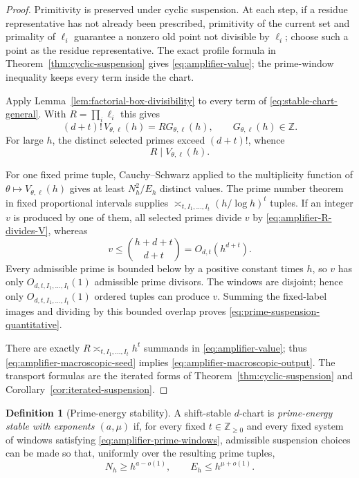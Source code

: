 \documentclass[11pt,reqno]{amsart}
\theoremstyle{definition}
\newtheorem{definition}[theorem]{Definition}
\theoremstyle{remark}
\begin{document}
\begin{proof}
Primitivity is preserved under cyclic suspension.  At each step, if a
residue representative has not already been prescribed, primitivity of the
current set and primality of $\ell_i$ guarantee a nonzero old point not
divisible by $\ell_i$; choose such a point as the residue representative.
The exact profile
formula in Theorem~\ref{thm:cyclic-suspension} gives
\eqref{eq:amplifier-value}; the prime-window inequality keeps every term
inside the chart.

Apply Lemma~\ref{lem:factorial-box-divisibility} to every term of
\eqref{eq:stable-chart-general}.  With $R=\prod_i\ell_i$ this gives
\begin{equation}\label{eq:amplifier-divisor-identity}
 (d+t)!\,V_{\theta,\boldsymbol\ell}(h)
 =R G_{\theta,\boldsymbol\ell}(h),
 \qquad G_{\theta,\boldsymbol\ell}(h)\in\mathbb Z.
\end{equation}
For large $h$, the distinct selected primes exceed $(d+t)!$, whence
\begin{equation}\label{eq:amplifier-R-divides-V}
 R\mid V_{\theta,\boldsymbol\ell}(h).
\end{equation}

For one fixed prime tuple, Cauchy--Schwarz applied to the multiplicity
function of $\theta\mapsto V_{\theta,\boldsymbol\ell}(h)$ gives at least
$N_h^2/E_h$ distinct values.  The prime number theorem in fixed proportional
intervals supplies $\asymp_{t,I_1,\ldots,I_t}(h/\log h)^t$ tuples.  If an
integer $v$ is produced by one of them, all selected primes divide $v$ by
\eqref{eq:amplifier-R-divides-V}, whereas
\[
 v\leq\binom{h+d+t}{d+t}=O_{d,t}(h^{d+t}).
\]
Every admissible prime is bounded below by a positive constant times $h$,
so $v$ has only $O_{d,t,I_1,\ldots,I_t}(1)$ admissible prime divisors.  The
windows are disjoint; hence only $O_{d,t,I_1,\ldots,I_t}(1)$ ordered tuples
can produce $v$.  Summing the fixed-label images and dividing by this bounded
overlap proves \eqref{eq:prime-suspension-quantitative}.

There are exactly $R\asymp_{t,I_1,\ldots,I_t}h^t$ summands in
\eqref{eq:amplifier-value}; thus \eqref{eq:amplifier-macroscopic-seed}
implies \eqref{eq:amplifier-macroscopic-output}.  The transport formulas are
the iterated forms of Theorem~\ref{thm:cyclic-suspension} and
Corollary~\ref{cor:iterated-suspension}.
\end{proof}

\begin{definition}[Prime-energy stability]
\label{def:prime-energy-stability}
A shift-stable $d$-chart is \emph{prime-energy stable with exponents
$(a,\mu)$} if, for every fixed $t\in\mathbb Z_{\geq0}$ and every fixed system of windows
satisfying \eqref{eq:amplifier-prime-windows}, admissible suspension choices
can be made so that, uniformly over the resulting prime tuples,
\[
 N_h\geq h^{a-o(1)},\qquad E_h\leq h^{\mu+o(1)}.
\]
\end{definition}
\end{document}
